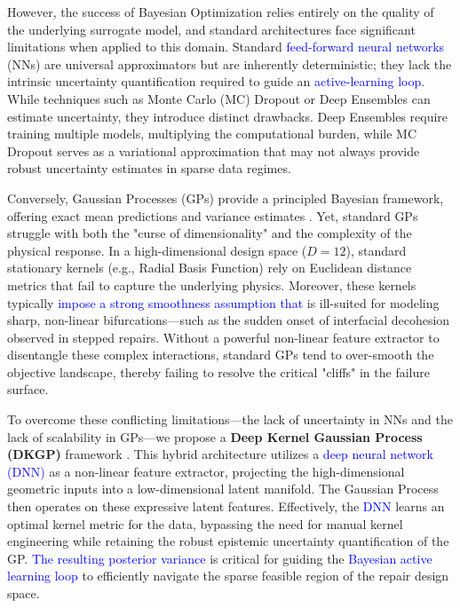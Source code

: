 \documentclass[
  preprint,
  12pt,
  a4paper
]{elsarticle}
\newcommand{\new}[1]{\textcolor{blue}{#1}}
\begin{document}
However, the success of Bayesian Optimization relies entirely on the quality of the underlying surrogate model, and standard architectures face significant limitations when applied to this domain. Standard \new{feed-forward neural networks} (NNs) are universal approximators but are inherently deterministic; they lack the intrinsic uncertainty quantification required to guide an \new{active-learning loop}. While techniques such as Monte Carlo (MC) Dropout \cite{gal2016dropout} or Deep Ensembles \cite{lakshminarayanan2017simple} can estimate uncertainty, they introduce distinct drawbacks. Deep Ensembles require training multiple models, multiplying the computational burden, while MC Dropout serves as a variational approximation that may not always provide robust uncertainty estimates in sparse data regimes.


Conversely, Gaussian Processes (GPs) provide a principled Bayesian framework, offering exact mean predictions and variance estimates \cite{rasmussen2006gaussian}. Yet, standard GPs struggle with both the "curse of dimensionality" and the complexity of the physical response. In a high-dimensional design space ($D=12$), standard stationary kernels (e.g., Radial Basis Function) rely on Euclidean distance metrics that fail to capture the underlying physics. Moreover, these kernels typically \new{impose a strong smoothness assumption that} is ill-suited for modeling sharp, non-linear bifurcations—such as the sudden onset of interfacial decohesion observed in stepped repairs. Without a powerful non-linear feature extractor to disentangle these complex interactions, standard GPs tend to over-smooth the objective landscape, thereby failing to resolve the critical "cliffs" in the failure surface.

To overcome these conflicting limitations—the lack of uncertainty in NNs and the lack of scalability in GPs—we propose a \textbf{Deep Kernel Gaussian Process (DKGP)} framework \cite{wilson2016deep}. This hybrid architecture utilizes a \new{deep neural network (DNN)} as a non-linear feature extractor, projecting the high-dimensional geometric inputs into a low-dimensional latent manifold. The Gaussian Process then operates on these expressive latent features. Effectively, the \new{DNN} learns an optimal kernel metric for the data, bypassing the need for manual kernel engineering while retaining the robust epistemic uncertainty quantification of the GP. \new{The resulting posterior variance} is critical for guiding the \new{Bayesian active learning loop} to efficiently navigate the sparse feasible region of the repair design space.
\end{document}
